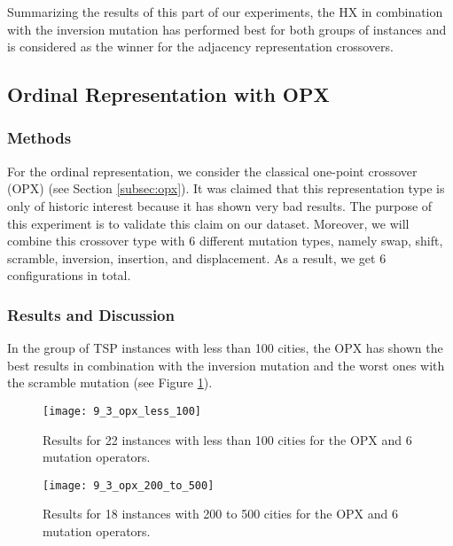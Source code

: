 Summarizing the results of this part of our experiments, the HX in combination with the inversion mutation has performed best for both groups of instances and is considered as the winner for the adjacency representation crossovers.\par

\subsection{Ordinal Representation with OPX}
\label{subsec:experiments_ordinal}

\subsubsection{Methods}

For the ordinal representation, we consider the classical one-point crossover (OPX) (see Section \ref{subsec:opx}). It was claimed \cite{potvin1996genetic} that this representation type is only of historic interest because it has shown very bad results. The purpose of this experiment is to validate this claim on our dataset. Moreover, we will combine this crossover type with 6 different mutation types, namely swap, shift, scramble, inversion, insertion, and displacement. As a result, we get 6 configurations in total.\par  

\subsubsection{Results and Discussion}

In the group of TSP instances with less than 100 cities, the OPX has shown the best results in combination with the inversion mutation and the worst ones with the scramble mutation (see Figure \ref{fig:9_3_opx_less_100}).

\begin{figure}[htp] \centering
	\centering
	\texttt{[image: 9\_3\_opx\_less\_100]}
	\caption{Results for 22 instances with less than 100 cities for the OPX and 6 mutation operators.}
	\label{fig:9_3_opx_less_100}
\end{figure}

\begin{figure}[htp] \centering
	\centering
	\texttt{[image: 9\_3\_opx\_200\_to\_500]}
	\caption{Results for 18 instances with 200 to 500 cities for the OPX and 6 mutation operators.}
	\label{fig:9_3_opx_200_to_500}
\end{figure}

